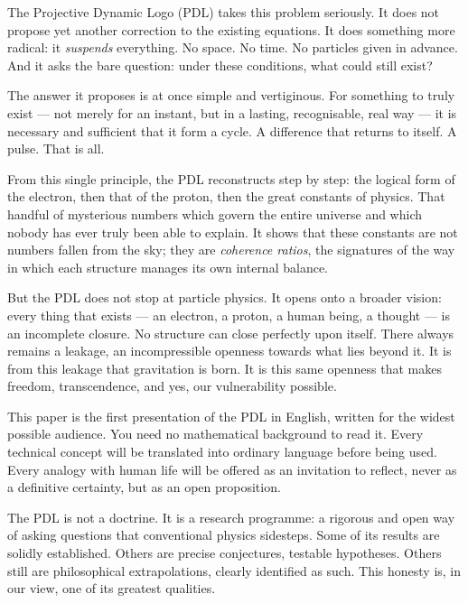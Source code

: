 \documentclass[11pt, a4paper, openright]{book}
\begin{document}
\medskip

The Projective Dynamic Logo (PDL) takes this problem seriously. It does not propose yet another correction to the existing equations. It does something more radical: it \emph{suspends} everything. No space. No time. No particles given in advance. And it asks the bare question: under these conditions, what could still exist?

\medskip

The answer it proposes is at once simple and vertiginous. For something to truly exist --- not merely for an instant, but in a lasting, recognisable, real way --- it is necessary and sufficient that it form a cycle. A difference that returns to itself. A pulse. That is all.

\medskip

From this single principle, the PDL reconstructs step by step: the logical form of the electron, then that of the proton, then the great constants of physics. That handful of mysterious numbers which govern the entire universe and which nobody has ever truly been able to explain. It shows that these constants are not numbers fallen from the sky; they are \emph{coherence ratios}, the signatures of the way in which each structure manages its own internal balance.

\medskip

But the PDL does not stop at particle physics. It opens onto a broader vision: every thing that exists --- an electron, a proton, a human being, a thought --- is an incomplete closure. No structure can close perfectly upon itself. There always remains a leakage, an incompressible openness towards what lies beyond it. It is from this leakage that gravitation is born. It is this same openness that makes freedom, transcendence, and yes, our vulnerability possible.

\medskip

This paper is the first presentation of the PDL in English, written for the widest possible audience. You need no mathematical background to read it. Every technical concept will be translated into ordinary language before being used. Every analogy with human life will be offered as an invitation to reflect, never as a definitive certainty, but as an open proposition.

\medskip

The PDL is not a doctrine. It is a research programme: a rigorous and open way of asking questions that conventional physics sidesteps. Some of its results are solidly established. Others are precise conjectures, testable hypotheses. Others still are philosophical extrapolations, clearly identified as such. This honesty is, in our view, one of its greatest qualities.
\end{document}

